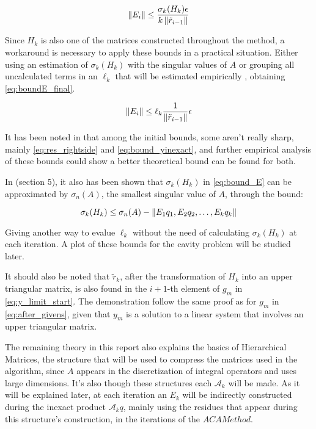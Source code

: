 \begin{equation}\label{eq:bound_E}
    \left\lVert E_{i}\right\rVert \leq \frac{\sigma_{k}(H_{k})\epsilon}{k\left\lVert\tilde{r}_{i-1}\right\rVert}
\end{equation}

Since $H_{k}$ is also one of the matrices constructed throughout the method, a workaround is necessary to apply these bounds in a practical situation. Either using an estimation of $\sigma_{k}(H_{k})$ with the singular values of $A$ or grouping all uncalculated terms in an $\ell_{k}$ that will be estimated empirically \cite{simoncini2003theory}, obtaining \ref{eq:boundE_final}.

\begin{equation}\label{eq:boundE_final}
    \left\lVert E_{i}\right\rVert \leq \ell_{k} \frac{1}{\left\lVert\tilde{r}_{i-1}\right\rVert} \epsilon
\end{equation}

It has been noted in \cite{simoncini2003theory} that among the initial bounds, some aren't really sharp, mainly \ref{eq:res_rightside} and \ref{eq:bound_yinexact}, and further empirical analysis of these bounds could show a better theoretical bound can be found for both.

In \cite{simoncini2003theory}(section 5), it also has been shown that $\sigma_{k}(H_{k})$ in \autoref{eq:bound_E} can be approximated by $\sigma_{n}(A)$, the smallest singular value of $A$, through the bound:

\begin{equation}
    \sigma_{k}(H_{k}) \leq \sigma_{n}(A) - \left\lVert E_{1}q_{1}, E_{2}q_{2}, \dots, E_{k}q_{k}\right\rVert
\end{equation}

Giving another way to evalue $\ell_{k}$ without the need of calculating $\sigma_{k}(H_{k})$ at each iteration. A plot of these bounds for the cavity problem will be studied later.

It should also be noted that $\tilde{r}_{k}$, after the transformation of $H_{k}$ into an upper triangular matrix, is also found in the $i+1$-th element of $g_{m}$ in \ref{eq:y_limit_start}. The demonstration follow the same proof as for $g_{m}$ in \ref{eq:after_givens}, given that $y_{m}$ is a solution to a linear system that involves an upper triangular matrix.

The remaining theory in this report also explains the basics of Hierarchical Matrices, the structure that will be used to compress the matrices used in the algorithm, since $A$ appears in the discretization of integral operators and uses large dimensions.
It's also though these structures each $\mathcal{A}_{k}$ will be made. As it will be explained later, at each iteration an $E_{k}$ will be indirectly constructed during the inexact product $\mathcal{A}_{k}q$, mainly using the residues that appear during this structure's construction, in the iterations of the $ACA Method$.